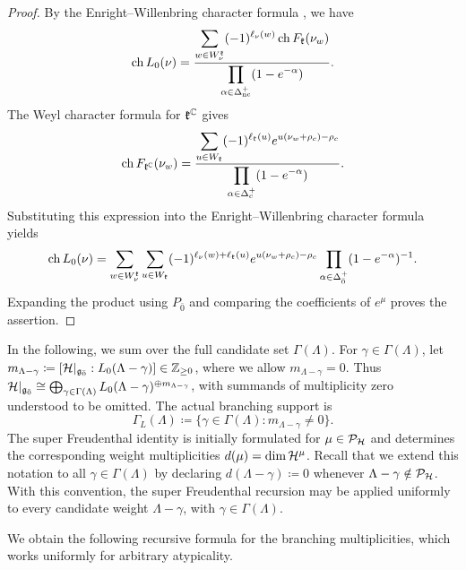 \begin{proof}
 By the Enright--Willenbring character formula \cite{Enright_Willenbring}, we have 
\[
 \operatorname{ch}L_0(\nu)
 =
 \frac{
 \displaystyle
 \sum_{w\in W_\nu^{{\mathfrak k}}}
 (-1)^{\ell_\nu(w)}
 \operatorname{ch}F_{{\mathfrak k}}(\nu_w)
 }{
 \displaystyle
 \prod_{\alpha\in\Delta_{\mathrm{nc}}^+}
 (1-e^{-\alpha})
 }.
\]
The Weyl character formula for ${\mathfrak k}^{{\mathbb C}}$ gives
\[
 \operatorname{ch}F_{{\mathfrak k}^{{\mathbb C}}}(\nu_w)
 =
 \frac{
 \displaystyle
 \sum_{u\in W_{{\mathfrak k}}}
 (-1)^{\ell_{{\mathfrak k}}(u)}
 e^{u(\nu_w+\rho_{c})-\rho_{c}}
 }{
 \displaystyle
 \prod_{\alpha\in\Delta_{c}^+}
 (1-e^{-\alpha})
 }.
\]
Substituting this expression into the Enright--Willenbring character formula yields
\[
 \operatorname{ch}L_0(\nu)
 =
 \sum_{w\in W_\nu^{{\mathfrak k}}}
 \sum_{u\in W_{{\mathfrak k}}}
 (-1)^{\ell_\nu(w)+\ell_{{\mathfrak k}}(u)}
 e^{u(\nu_w+\rho_{c})-\rho_{c}}
 \prod_{\alpha\in\Delta_{\bar0}^+}
 (1-e^{-\alpha})^{-1}.
\]
Expanding the product using $P_{\bar{0}}$ and comparing
the coefficients of $e^\mu$ proves the assertion.
\end{proof}

In the following, we sum over the full candidate set $\Gamma(\Lambda)$. For $\gamma\in\Gamma(\Lambda)$, let $m_{\Lambda-\gamma}\coloneqq[{\mathcal{H}}\vert_{{\mathfrak{g}_{\bar{0}}}}:L_0(\Lambda-\gamma)]\in\mathbb Z_{\geq0}$, where we allow $m_{\Lambda-\gamma}=0$. Thus ${\mathcal{H}}\vert_{{\mathfrak{g}_{\bar{0}}}}\cong\bigoplus_{\gamma\in\Gamma(\Lambda)}L_0(\Lambda-\gamma)^{\oplus m_{\Lambda-\gamma}}$, with summands of multiplicity zero understood to be omitted. The actual branching support is
\[
\Gamma_L(\Lambda)
\coloneqq
\{\gamma\in\Gamma(\Lambda):m_{\Lambda-\gamma}\neq0\}.
\]
The super Freudenthal identity is initially formulated for
\(\mu\in\mathcal P_{{\mathcal{H}}}\) and determines the corresponding weight
multiplicities \(d(\mu)=\dim {\mathcal{H}}^\mu\). Recall that we extend this notation to all
$\gamma\in\Gamma(\Lambda)$ by declaring
$
d(\Lambda-\gamma)\coloneqq0$ whenever $\Lambda-\gamma\notin\mathcal P_{{\mathcal{H}}}$.
With this convention, the super Freudenthal recursion may be applied
uniformly to every candidate weight \(\Lambda-\gamma\), with
\(\gamma\in\Gamma(\Lambda)\).

We obtain the following recursive formula for the branching multiplicities, which works uniformly for arbitrary atypicality.


